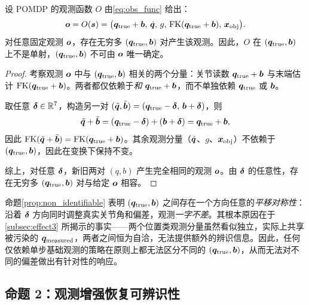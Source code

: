 \begin{proposition}[基础观测下的不可辨识性]\label{prop:non_identifiable}
设 POMDP 的观测函数 $O$ 由\cref{eq:obs_func} 给出：
\[
  \bm{o} = O(\bm{s}) = \big(\bm{q}_{\text{true}} + \bm{b},\,\dot{\bm{q}},\,g,\,\text{FK}(\bm{q}_{\text{true}} + \bm{b}),\,\bm{x}_{\text{obj}}\big).
\]
对任意固定观测 $\bm{o}$，存在无穷多 $(\bm{q}_{\text{true}}, \bm{b})$ 对产生该观测。因此，$O$ 在 $(\bm{q}_{\text{true}}, \bm{b})$ 上不是单射，$(\bm{q}_{\text{true}}, \bm{b})$ 不可由 $\bm{o}$ 唯一确定。
\end{proposition}

\begin{proof}
考察观测 $\bm{o}$ 中与 $(\bm{q}_{\text{true}}, \bm{b})$ 相关的两个分量：关节读数 $\bm{q}_{\text{true}} + \bm{b}$ 与末端估计 $\text{FK}(\bm{q}_{\text{true}} + \bm{b})$。两者都仅依赖于\emph{和} $\bm{q}_{\text{true}} + \bm{b}$，而不单独依赖 $\bm{q}_{\text{true}}$ 或 $\bm{b}$。

取任意 $\bm{\delta} \in \mathbb{R}^7$，构造另一对 $(\tilde{\bm{q}}, \tilde{\bm{b}}) = (\bm{q}_{\text{true}} - \bm{\delta},\,\bm{b} + \bm{\delta})$，则
\[
  \tilde{\bm{q}} + \tilde{\bm{b}} = (\bm{q}_{\text{true}} - \bm{\delta}) + (\bm{b} + \bm{\delta}) = \bm{q}_{\text{true}} + \bm{b},
\]
因此 $\text{FK}(\tilde{\bm{q}} + \tilde{\bm{b}}) = \text{FK}(\bm{q}_{\text{true}} + \bm{b})$。其余观测分量（$\dot{\bm{q}}$、$g$、$\bm{x}_{\text{obj}}$）不依赖于 $(\bm{q}_{\text{true}}, \bm{b})$，因此在变换下保持不变。

综上，对任意 $\bm{\delta}$，新旧两对 $(q, b)$ 产生完全相同的观测 $\bm{o}$。由 $\bm{\delta}$ 的任意性，存在无穷多 $(\bm{q}_{\text{true}}, \bm{b})$ 对与给定 $\bm{o}$ 相容。\end{proof}

命题\ref{prop:non_identifiable} 表明 $(\bm{q}_{\text{true}}, \bm{b})$ 之间存在一个方向任意的\emph{平移对称性}：沿着 $\bm{\delta}$ 方向同时调整真实关节角和偏差，观测\emph{一字不差}。其根本原因在于\cref{subsec:effect3} 所揭示的事实——两个位置类观测分量虽然看似独立，实际上共享被污染的 $\bm{q}_{\text{measured}}$，两者之间恒为自洽，无法提供额外的辨识信息。因此，任何仅依赖单步基础观测的策略在原则上都无法区分不同的 $(\bm{q}_{\text{true}}, \bm{b})$，从而无法对不同的偏差做出有针对性的响应。

\subsection{命题 2：观测增强恢复可辨识性}\label{subsec:identifiable_augmented}


